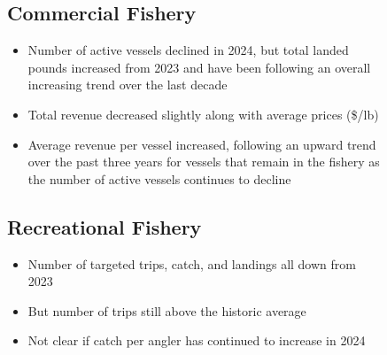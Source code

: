 \documentclass[
  10pt,
  letterpaper,
  DIV=11,
  numbers=noendperiod]{scrartcl}
\providecommand{\tightlist}{%
  \setlength{\itemsep}{0pt}\setlength{\parskip}{0pt}}\usepackage{longtable,booktabs,array}
\begin{document}
\begin{figure}
\begin{minipage}[t]{0.57\linewidth}
{}

\end{minipage}%
%
\begin{minipage}[t]{0.03\linewidth}

{\centering 

\subsection{Commercial Fishery}

}

\end{minipage}%
%
\begin{minipage}[t]{0.40\linewidth}

{\centering 

\begin{itemize}
\tightlist
\item
  Number of active vessels declined in 2024, but total landed pounds
  increased from 2023 and have been following an overall increasing
  trend over the last decade
\item
  Total revenue decreased slightly along with average prices (\$/lb)
\item
  Average revenue per vessel increased, following an upward trend over
  the past three years for vessels that remain in the fishery as the
  number of active vessels continues to decline
\end{itemize}

}

\end{minipage}%
\newline
\begin{minipage}[t]{0.57\linewidth}

{\centering 

\subsection{Recreational Fishery}

}

\end{minipage}%
%
\begin{minipage}[t]{0.03\linewidth}

{\centering 

\begin{itemize}
\tightlist
\item
  Number of targeted trips, catch, and landings all down from 2023
\item
  But number of trips still above the historic average
\item
  Not clear if catch per angler has continued to increase in 2024
\end{itemize}

}
\end{minipage}
\end{figure}
\end{document}
